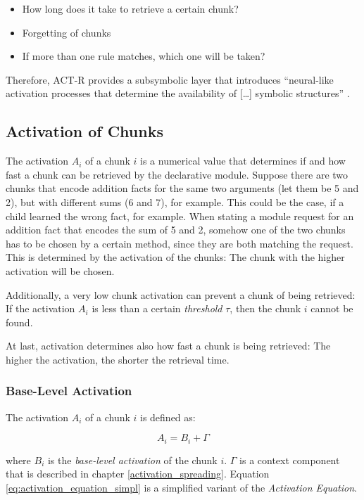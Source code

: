 \begin{itemize}
\item How long does it take to retrieve a certain chunk? 
\item Forgetting of chunks
\item If more than one rule matches, which one will be taken?
\end{itemize}

Therefore, ACT-R provides a subsymbolic layer that introduces ``neural-like activation processes that determine the availability of [\dots] symbolic structures'' \cite{anderson_implications_2000}.

\subsection{Activation of Chunks}
\label{activation}

The activation $A_i$ of a chunk $i$ is a numerical value that determines if and how fast a chunk can be retrieved by the declarative module. Suppose there are two chunks that encode addition facts for the same two arguments (let them be 5 and 2), but with different sums (6 and 7), for example. This could be the case, if a child learned the wrong fact, for example. When stating a module request for an addition fact that encodes the sum of 5 and 2, somehow one of the two chunks has to be chosen by a certain method, since they are both matching the request. This is determined by the activation of the chunks: The chunk with the higher activation will be chosen.

Additionally, a very low chunk activation can prevent a chunk of being retrieved: If the activation $A_i$ is less than a certain \emph{threshold} $\tau$, then the chunk $i$ cannot be found.

At last, activation determines also how fast a chunk is being retrieved: The higher the activation, the shorter the retrieval time.

\subsubsection{Base-Level Activation}

The activation $A_i$ of a chunk $i$ is defined as:

\begin{equation}
 \label{eq:activation_equation_simpl}
 A_i = B_i + \Gamma
\end{equation}

where $B_i$ is the \emph{base-level activation} of the chunk $i$. $\Gamma$ is a context component that is described in chapter \ref{activation_spreading}. Equation \eqref{eq:activation_equation_simpl} is a simplified variant of the \emph{Activation Equation}.

